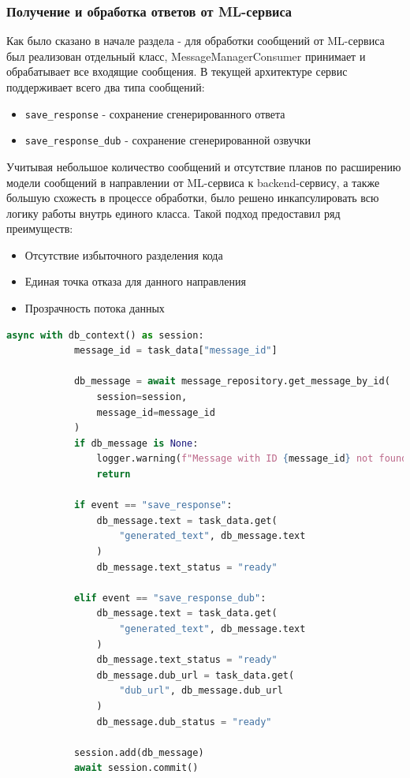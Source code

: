 \subsubsection{Получение и обработка ответов от ML-сервиса}
Как было сказано в начале раздела - для обработки сообщений от ML-сервиса был реализован отдельный класс, MessageManagerConsumer принимает и обрабатывает все входящие сообщения. В текущей архитектуре сервис поддерживает всего два типа сообщений:
\begin{itemize}
    \item \texttt{save\_response} - сохранение сгенерированного ответа
    \item \texttt{save\_response\_dub} - сохранение сгенерированной озвучки
\end{itemize}
Учитывая небольшое количество сообщений и отсутствие планов по расширению модели сообщений в направлении от ML-сервиса к backend-сервису, а также большую схожесть в процессе обработки, было решено инкапсулировать всю логику работы внутрь единого класса. Такой подход предоставил ряд преимуществ:
\begin{itemize}
    \item Отсутствие избыточного разделения кода
    \item Единая точка отказа для данного направления
    \item Прозрачность потока данных
\end{itemize}
\begin{lstlisting}[language=Python, numbers=none, frame=none]
async with db_context() as session:
            message_id = task_data["message_id"]

            db_message = await message_repository.get_message_by_id(
                session=session,
                message_id=message_id
            )
            if db_message is None:
                logger.warning(f"Message with ID {message_id} not found.")
                return

            if event == "save_response":
                db_message.text = task_data.get(
                    "generated_text", db_message.text
                )
                db_message.text_status = "ready"

            elif event == "save_response_dub":
                db_message.text = task_data.get(
                    "generated_text", db_message.text
                )
                db_message.text_status = "ready"
                db_message.dub_url = task_data.get(
                    "dub_url", db_message.dub_url
                )
                db_message.dub_status = "ready"

            session.add(db_message)
            await session.commit()
\end{lstlisting}
